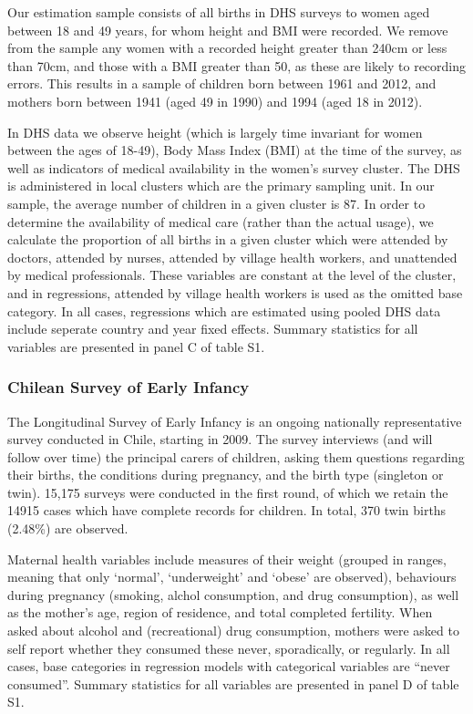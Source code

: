 \documentclass{nature}
\begin{document}
\begin{linenumbers}
Our estimation sample consists of all births in DHS surveys to women aged between 18 and 49 years, for whom height and BMI were recorded.  We remove from the sample any women with a recorded height greater than 240cm or less than 70cm, and those with a BMI greater than 50, as these are likely to recording errors.  This results in a sample of children born between 1961 and 2012, and mothers born between 1941 (aged 49 in 1990) and 1994 (aged 18 in 2012).  

In DHS data we observe height (which is largely time invariant for women between the ages of 18-49), Body Mass Index (BMI) at the time of the survey, as well as indicators of medical availability in the women's survey cluster.  The DHS is administered in local clusters which are the primary sampling unit.  In our sample, the average number of children in a given cluster is 87.  In order to determine the availability of medical care (rather than the actual usage), we calculate the proportion of all births in a given cluster which were attended by doctors, attended by nurses, attended by village health workers, and unattended by medical professionals.  These variables are constant at the level of the cluster, and in regressions, attended by village health workers is used as the omitted base category.  In all cases, regressions which are estimated using pooled DHS data include seperate country and year fixed effects.  Summary statistics for all variables are presented in panel C of table S1.

\subsubsection{Chilean Survey of Early Infancy}
The Longitudinal Survey of Early Infancy is an ongoing nationally representative survey conducted in Chile, starting in 2009.  The survey interviews (and will follow over time) the principal carers of children, asking them questions regarding their births, the conditions during pregnancy, and the birth type (singleton or twin).  15,175 surveys were conducted in the first round, of which we retain the 14915 cases which have complete records for children.  In total, 370 twin births (2.48\%) are observed.

Maternal health variables include measures of their weight (grouped in ranges, meaning that only `normal', `underweight' and `obese' are observed), behaviours during pregnancy (smoking, alchol consumption, and drug consumption), as well as the mother's age, region of residence, and total completed fertility.  When asked about alcohol and (recreational) drug consumption, mothers were asked to self report whether they consumed these never, sporadically, or regularly.  In all cases, base categories in regression models with categorical variables are ``never consumed''.  Summary statistics for all variables are presented in panel D of table S1.


\end{linenumbers}
\end{document}
